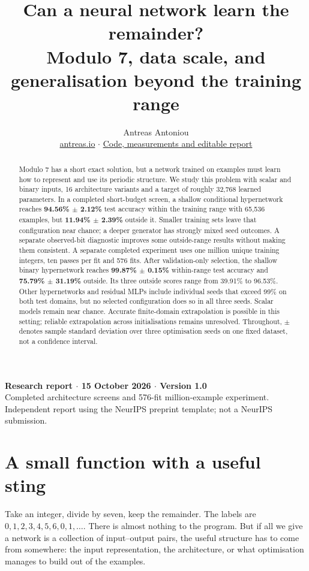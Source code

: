 \documentclass{article}
\title{Can a neural network learn the remainder?\\
\large Modulo 7, data scale, and generalisation beyond the training range}
\author{Antreas Antoniou\\
\href{https://antreas.io}{antreas.io} \quad $\cdot$ \quad \href{\repo}{Code, measurements and editable report}}
\begin{document}
\maketitle
\begin{center}
\small\textbf{Research report $\cdot$ 15 October 2026 $\cdot$ Version 1.0}\\
Completed architecture screens and 576-fit million-example experiment.\\
Independent report using the NeurIPS preprint template; not a NeurIPS submission.
\end{center}

\begin{abstract}
Modulo 7 has a short exact solution, but a network trained on examples must learn
how to represent and use its periodic structure. We study this problem with scalar
and binary inputs, 16 architecture variants and a target of roughly 32,768 learned
parameters. In a completed short-budget screen, a shallow conditional hypernetwork
reaches \textbf{94.56\% $\pm$ 2.12\%} test accuracy within the training range with
65,536 examples, but \textbf{11.94\% $\pm$ 2.39\%} outside it. Smaller training sets
leave that configuration near chance; a deeper generator has strongly mixed seed
outcomes. A separate observed-bit diagnostic improves some outside-range results
without making them consistent. A separate completed experiment uses one million
unique training integers, ten passes per fit and 576 fits. After validation-only
selection, the shallow binary hypernetwork reaches \textbf{99.87\% $\pm$ 0.15\%}
within-range test accuracy and \textbf{75.79\% $\pm$ 31.19\%} outside. Its three
outside scores range from 39.91\% to 96.53\%. Other hypernetworks and residual
MLPs include individual seeds that exceed 99\% on both test domains, but no
selected configuration does so in all three seeds. Scalar models remain near
chance. Accurate finite-domain extrapolation is possible in this setting;
reliable extrapolation across initialisations remains unresolved.
Throughout, $\pm$ denotes sample standard deviation over three optimisation seeds
on one fixed dataset, not a confidence interval.
\end{abstract}

\section{A small function with a useful sting}
Take an integer, divide by seven, keep the remainder. The labels are
$0,1,2,3,4,5,6,0,1,\ldots$. There is almost nothing to the program. But if all we give
a network is a collection of input--output pairs, the useful structure has to come
from somewhere: the input representation, the architecture, or what optimisation
manages to build out of the examples.
\end{document}
